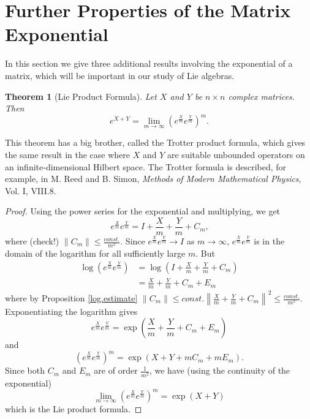 \documentclass{amsbook}
\theoremstyle{plain}
\newtheorem{theorem}{Theorem}
\numberwithin{equation}{chapter}
\numberwithin{theorem}{chapter}
\begin{document}
\section{Further Properties of the Matrix Exponential\label{further}}

In this section we give three additional results involving the exponential of
a matrix, which will be important in our study of Lie algebras.

\begin{theorem}
[Lie Product Formula]Let $X$ and $Y$ be $n\times n$ complex matrices. Then
\[
e^{X+Y}=\lim_{m\rightarrow\infty}\left(  e^{\frac{X}{m}}e^{\frac{Y}{m}%
}\right)  ^{m}\text{.}%
\]
\end{theorem}

This theorem has a big brother, called the Trotter product formula, which
gives the same result in the case where $X$ and $Y$ are suitable unbounded
operators on an infinite-dimensional Hilbert space. The Trotter formula is
described, for example, in M. Reed and B. Simon, \textit{Methods of Modern
Mathematical Physics}, Vol. I, VIII.8.

\begin{proof}
Using the power series for the exponential and multiplying, we get
\[
e^{\frac{X}{m}}e^{\frac{Y}{m}}=I+\frac{X}{m}+\frac{Y}{m}+C_{m}\text{,}%
\]
where (check!) $\left\|  C_{m}\right\|  \leq\frac{const.}{m^{2}}$. Since
$e^{\frac{X}{m}}e^{\frac{Y}{m}}\rightarrow I$ as $m\rightarrow\infty$,
$e^{\frac{X}{m}}e^{\frac{Y}{m}}$ is in the domain of the logarithm for all
sufficiently large $m$. But
\begin{align*}
\log\left(  e^{\frac{X}{m}}e^{\frac{Y}{m}}\right)    & =\log\left(  I+\frac
{X}{m}+\frac{Y}{m}+C_{m}\right)  \\
& =\frac{X}{m}+\frac{Y}{m}+C_{m}+E_{m}%
\end{align*}
where by Proposition \ref{log.estimate} $\left\|  C_{m}\right\|  \leq
const.\left\|  \frac{X}{m}+\frac{Y}{m}+C_{m}\right\|  ^{2}\leq\frac
{const.}{m^{2}}$. Exponentiating the logarithm gives
\[
e^{\frac{X}{m}}e^{\frac{Y}{m}}=\exp\left(  \frac{X}{m}+\frac{Y}{m}+C_{m}%
+E_{m}\right)
\]
and
\[
\left(  e^{\frac{X}{m}}e^{\frac{Y}{m}}\right)  ^{m}=\exp\left(  X+Y+mC_{m}%
+mE_{m}\right)  \text{.}%
\]
Since both $C_{m}$ and $E_{m}$ are of order $\frac{1}{m^{2}}$, we have (using
the continuity of the exponential)
\[
\lim_{m\rightarrow\infty}\left(  e^{\frac{X}{m}}e^{\frac{Y}{m}}\right)
^{m}=\exp\left(  X+Y\right)
\]
which is the Lie product formula.
\end{proof}
\end{document}
